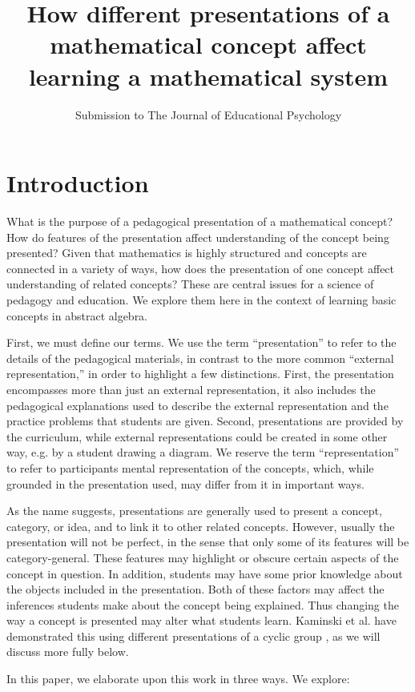 \documentclass[man,10pt]{apa6}
\title{How different presentations of a mathematical concept affect learning a mathematical system}
\author{Submission to The Journal of Educational Psychology}
\affiliation{Submission: November 15th, 2016\\ Revision: April 27th, 2017} %
\date{}
\begin{document}
\maketitle
\section{Introduction}
What is the purpose of a pedagogical presentation of a mathematical concept? How do features of the presentation affect understanding of the concept being presented? Given that mathematics is highly structured and concepts are connected in a variety of ways, how does the presentation of one concept affect understanding of related concepts? These are central issues for a science of pedagogy and education. We explore them here in the context of learning basic concepts in abstract algebra.  \par
First, we must define our terms. We use the term ``presentation'' to refer to the details of the pedagogical materials, in contrast to the more common ``external representation,'' in order to highlight a few distinctions. First, the presentation encompasses more than just an external representation, it also includes the pedagogical explanations used to describe the external representation and the practice problems that students are given. Second, presentations are provided by the curriculum, while external representations could be created in some other way, e.g. by a student drawing a diagram. We reserve the term ``representation'' to refer to participants mental representation of the concepts, which, while grounded in the presentation used, may differ from it in important ways. \par
As the name suggests, presentations are generally used to present a concept, category, or idea, and to link it to other related concepts. However, usually the presentation will not be perfect, in the sense that only some of its features will be category-general. These features may highlight or obscure certain aspects of the concept in question. In addition, students may have some prior knowledge about the objects included in the presentation. Both of these factors may affect the inferences students make about the concept being explained. Thus changing the way a concept is presented may alter what students learn. Kaminski et al. have demonstrated this using different presentations of a cyclic group \cite{Kaminski2008}, as we will discuss more fully below. \par
In this paper, we elaborate upon this work in three ways. We explore:
\end{document}
